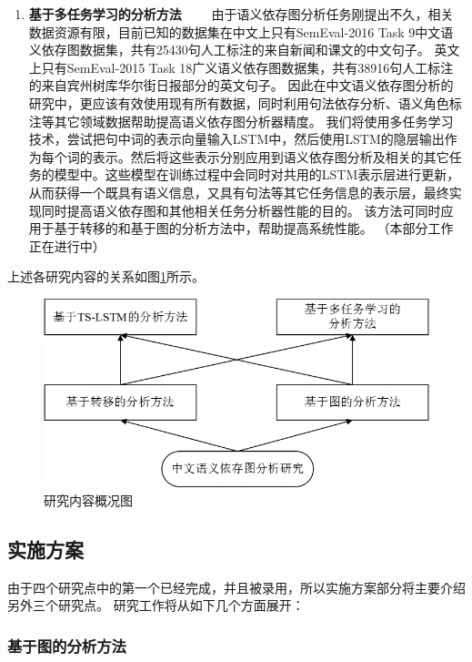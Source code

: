 \begin{enumerate}
	\item \textbf{基于多任务学习的分析方法}
	\ \ \ \ 由于语义依存图分析任务刚提出不久，相关数据资源有限，目前已知的数据集在中文上只有SemEval-2016 Task 9中文语义依存图数据集，共有25430句人工标注的来自新闻和课文的中文句子。
	英文上只有SemEval-2015 Task 18广义语义依存图数据集，共有38916句人工标注的来自宾州树库华尔街日报部分的英文句子。
	因此在中文语义依存图分析的研究中，更应该有效使用现有所有数据，同时利用句法依存分析、语义角色标注等其它领域数据帮助提高语义依存图分析器精度。
	我们将使用多任务学习技术，尝试把句中词的表示向量输入LSTM中，然后使用LSTM的隐层输出作为每个词的表示。然后将这些表示分别应用到语义依存图分析及相关的其它任务的模型中。这些模型在训练过程中会同时对共用的LSTM表示层进行更新，从而获得一个既具有语义信息，又具有句法等其它任务信息的表示层，最终实现同时提高语义依存图和其他相关任务分析器性能的目的。
	该方法可同时应用于基于转移的和基于图的分析方法中，帮助提高系统性能。
	（本部分工作正在进行中）
	
\end{enumerate}

上述各研究内容的关系如图\ref{fig:relation}所示。
\begin{figure}[htbp]
	\centering
	\includegraphics[width = 120mm]{picture/relation.jpg}
	\caption{研究内容概况图}
	\label{fig:relation}
\end{figure}



\subsection{实施方案}

由于四个研究点中的第一个已经完成，并且被录用，所以实施方案部分将主要介绍另外三个研究点。
研究工作将从如下几个方面展开：

\subsubsection{基于图的分析方法}


